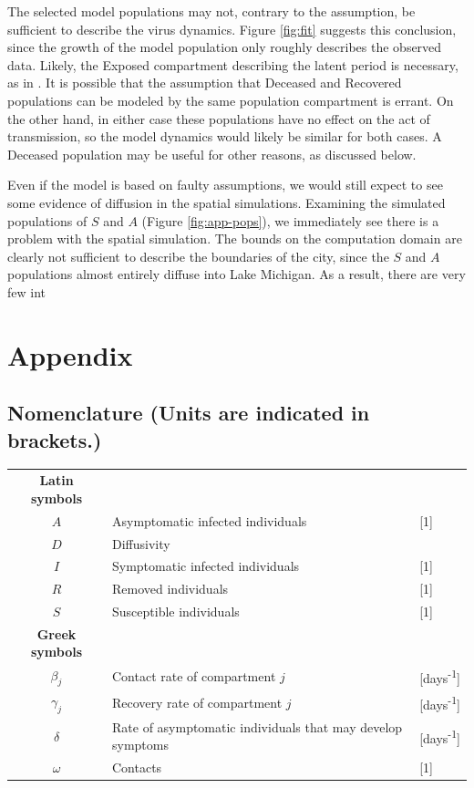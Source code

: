 \documentclass[11pt]{article}
\begin{document}
	The selected model populations may not, contrary to the assumption, be sufficient to describe the virus dynamics.
	Figure \ref{fig:fit} suggests this conclusion, since the growth of the model population only roughly describes the observed data.
	Likely, the Exposed compartment describing the latent period is necessary, as in \cite{Mammeri+2020+102+113}.
	It is possible that the assumption that Deceased and Recovered populations can be modeled by the same population compartment is errant.
	On the other hand, in either case these populations have no effect on the act of transmission, so the model dynamics would likely be similar for both cases.
	A Deceased population may be useful for other reasons, as discussed below.
	
	Even if the model is based on faulty assumptions, we would still expect to see some evidence of diffusion in the spatial simulations.
	Examining the simulated populations of $S$ and $A$ (Figure \ref{fig:app-pops}), we immediately see there is a problem with the spatial simulation.
	The bounds on the computation domain are clearly not sufficient to describe the boundaries of the city, since the $S$ and $A$ populations almost entirely diffuse into Lake Michigan.
	As a result, there are very few int
	

\section*{Appendix}
	\subsection*{Nomenclature (Units are indicated in brackets.)}
		\begin{longtable}{c l l}
			\textbf{Latin symbols} & & \\
			$A$ & Asymptomatic infected individuals & [1] \\
			$D$ & Diffusivity & \\
			$I$ & Symptomatic infected individuals & [1] \\
			$R$ & Removed individuals & [1] \\
			$S$ & Susceptible individuals & [1] \\
			\textbf{Greek symbols} & & \\
			$\beta_j$ & Contact rate of compartment $j$ & [days\textsuperscript{-1}] \\
			$\gamma_j$ & Recovery rate of compartment $j$ & [days\textsuperscript{-1}] \\
			$\delta$ & Rate of asymptomatic individuals that may develop symptoms & [days\textsuperscript{-1}] \\
			$\omega$ & Contacts & [1]
		\end{longtable}
	
\end{document}
